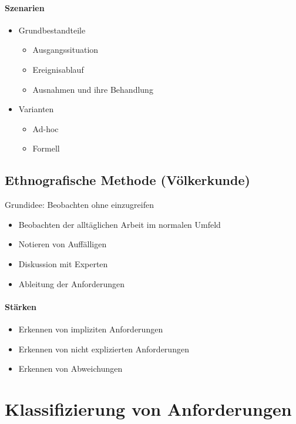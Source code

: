 \paragraph{Szenarien}
\begin{itemize}
\item {
Grundbestandteile
\begin{itemize}
\item Ausgangssituation
\item Ereignisablauf
\item Ausnahmen und ihre Behandlung
\end{itemize}
}
\item {
Varianten
\begin{itemize}
\item Ad-hoc
\item Formell
\end{itemize}
}
\end{itemize}

\subsection{Ethnografische Methode (Völkerkunde)}
Grundidee: Beobachten ohne einzugreifen

\begin{itemize}
\item Beobachten der alltäglichen Arbeit im normalen Umfeld
\item Notieren von Auffälligen
\item Diskussion mit Experten
\item Ableitung der Anforderungen
\end{itemize}

\paragraph{Stärken}
\begin{itemize}
\item Erkennen von impliziten Anforderungen 
\item Erkennen von nicht explizierten Anforderungen
\item Erkennen von Abweichungen
\end{itemize}


\newpage
\section{Klassifizierung von Anforderungen}


